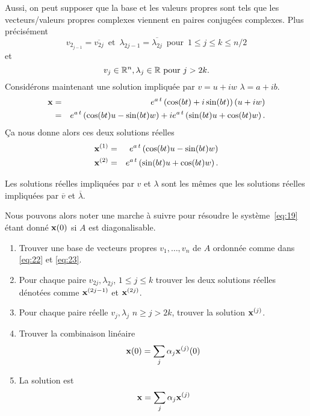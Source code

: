 Aussi, on peut supposer que la base et les valeurs propres sont tels que les vecteurs/valeurs propres complexes viennent en paires conjugées complexes. Plus précisément
\begin{equation}
\label{eq:22}
  v_{2_{j-1}} = \overline{v_{2j}}\, \text{ et } \, \lambda_{2j-1} = \overline{\lambda_{2j}} \, \text{ pour } \, 1 \leq j \leq k \leq n/2 
\end{equation}
et 
\begin{equation}
  \label{eq:23}  
  v_j \in \mathbb{R}^n, \lambda_j \in \mathbb{R} \text{ pour } j > 2k. 
\end{equation}
%
Considérons maintenant une solution impliquée par $v = u+iw$  $\lambda= a+ib$. 
\begin{eqnarray*}
  \mathbf{x} & = & e^{a \, t} \left(\cos (b t)  + i \sin (b t ) \right)  (u + i w)  \\
   & = & e^{a \, t} \left(\cos (b t) u - \sin (bt)w \right)  + ie^{a \, t} \left(\sin (b t ) u + \cos(bt)w \right). 
\end{eqnarray*}
Ça nous donne alors ces deux solutions réelles 
\begin{eqnarray*}
  \mathbf{x}^{(1)} & = & e^{a \, t} \left(\cos (b t) u - \sin (bt)w \right) \\
  \mathbf{x}^{(2)} & = &  e^{a \, t} \left(\sin (b t ) u + \cos(bt)w \right). 
\end{eqnarray*}
\begin{remark}
  \label{rem:2}
  Les solutions réelles impliquées par $v$ et $\lambda$ sont les mêmes que les solutions réelles impliquées par $\overline{v}$ et $\overline{\lambda}$. 
\end{remark}

Nous pouvons alors noter une marche à suivre pour résoudre le système~\eqref{eq:19} étant donné $\mathbf{x}(0)$ si $A$ est diagonalisable.
\begin{enumerate}
\item Trouver une base de vecteurs propres $v_1,\dots,v_n$ de $A$ ordonnée comme dans \eqref{eq:22} et \eqref{eq:23}. 
\item Pour chaque paire $v_{2j},\lambda_{2j}$, $1 \leq j \leq k$ trouver les  deux solutions réelles dénotées comme  $\mathbf{x}^{(2j-1)}$ et $\mathbf{x}^{(2j)}$. 
\item Pour chaque paire réelle $v_j, \lambda_j$ $n\geq j>2k$, trouver la solution $\mathbf{x}^{(j)}$. 
\item Trouver la combinaison linéaire 
  \begin{displaymath}
    \mathbf{x}(0) = \sum_{j} \alpha_j \mathbf{x}^{(j)}(0) 
  \end{displaymath}
\item La solution est 
  \begin{displaymath}
    \mathbf{x} = \sum_{j} \alpha_j \mathbf{x}^{(j)} 
  \end{displaymath}
\end{enumerate}



